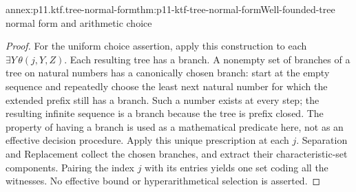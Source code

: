 \begin{annexitem}{annex:p11.ktf.tree-normal-form}{thm:p11-ktf-tree-normal-form}{Well-founded-tree normal form and arithmetic choice}
\begin{proof}
For the uniform choice assertion, apply this construction to each
\(\exists Y\,\theta(j,Y,Z)\). Each resulting tree has a branch.
A nonempty set of branches of a tree on natural numbers has a canonically
chosen branch: start at the empty sequence and repeatedly choose the
least next natural number for which the extended prefix still has a
branch. Such a number exists at every step; the resulting infinite
sequence is a branch because the tree is prefix closed. The property
of having a branch is used as a mathematical predicate here, not as
an effective decision procedure. Apply this unique prescription at
each \(j\). Separation and Replacement collect the chosen branches,
and extract their characteristic-set components. Pairing the index
\(j\) with its entries yields one set coding all the witnesses.
No effective bound or hyperarithmetical selection is asserted.
\end{proof}
\end{annexitem}

